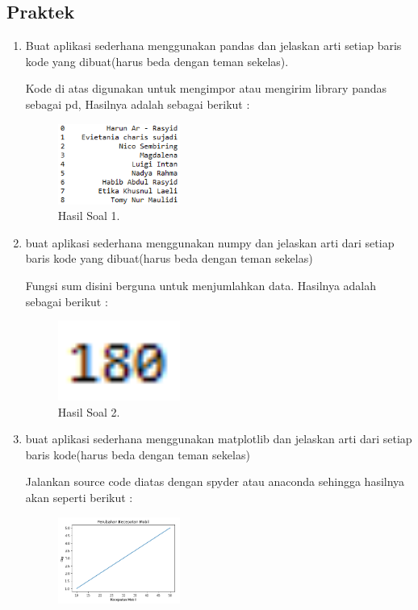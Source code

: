 \subsection{Praktek}
\begin{enumerate}
	\item Buat aplikasi sederhana menggunakan pandas dan jelaskan arti setiap baris kode yang dibuat(harus beda dengan teman sekelas).
	\hfill\break
	
	Kode di atas digunakan untuk mengimpor atau mengirim library pandas sebagai pd, Hasilnya adalah sebagai berikut :
	\begin{figure}[H]
	\centering
		\includegraphics[width=4cm]{figures/1174027/3/hasil1.png}
		\caption{Hasil Soal 1.}
	\end{figure}
	\item buat aplikasi sederhana menggunakan numpy dan jelaskan arti dari setiap baris kode yang dibuat(harus beda dengan teman sekelas)
	\hfill\break
	
	Fungsi sum disini berguna untuk menjumlahkan data. Hasilnya adalah sebagai berikut :
	\begin{figure}[H]
	\centering
		\includegraphics[width=4cm]{figures/1174027/3/hasil2.png}
		\caption{Hasil Soal 2.}
	\end{figure}
	\item buat aplikasi sederhana menggunakan matplotlib dan jelaskan arti dari setiap baris kode(harus beda dengan teman sekelas)
	\hfill\break
	
	Jalankan source code diatas dengan spyder atau anaconda sehingga hasilnya akan seperti berikut : 
	\begin{figure}[H]
	\centering
		\includegraphics[width=4cm]{figures/1174027/3/hasil3.png}

\end{figure}
\end{enumerate}
